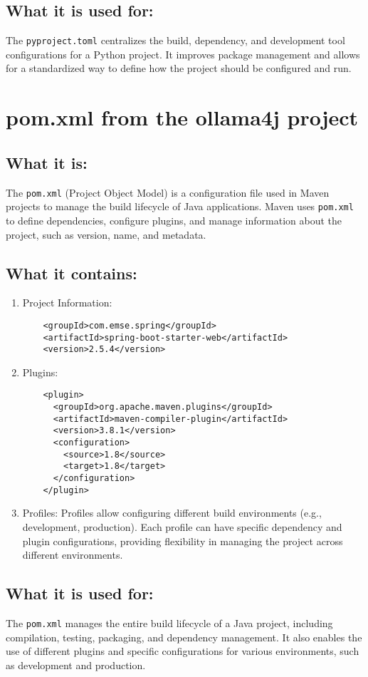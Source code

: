 \documentclass{article}
\begin{document}
\subsection{What it is used for:}
The \texttt{pyproject.toml} centralizes the build, dependency, and development tool configurations for a Python project. It improves package management and allows for a standardized way to define how the project should be configured and run.

\section{pom.xml from the ollama4j project}

\subsection{What it is:}
The \texttt{pom.xml} (Project Object Model) is a configuration file used in Maven projects to manage the build lifecycle of Java applications. Maven uses \texttt{pom.xml} to define dependencies, configure plugins, and manage information about the project, such as version, name, and metadata.

\subsection{What it contains:}
\begin{enumerate}
    \item Project Information:
    \begin{verbatim}
    <groupId>com.emse.spring</groupId>
    <artifactId>spring-boot-starter-web</artifactId>
    <version>2.5.4</version>
    \end{verbatim}
    \item Plugins:
    \begin{verbatim}
    <plugin>
      <groupId>org.apache.maven.plugins</groupId>
      <artifactId>maven-compiler-plugin</artifactId>
      <version>3.8.1</version>
      <configuration>
        <source>1.8</source>
        <target>1.8</target>
      </configuration>
    </plugin>
    \end{verbatim}
    \item Profiles: 
    Profiles allow configuring different build environments (e.g., development, production). Each profile can have specific dependency and plugin configurations, providing flexibility in managing the project across different environments.
\end{enumerate}

\subsection{What it is used for:}
The \texttt{pom.xml} manages the entire build lifecycle of a Java project, including compilation, testing, packaging, and dependency management. It also enables the use of different plugins and specific configurations for various environments, such as development and production.
\end{document}
